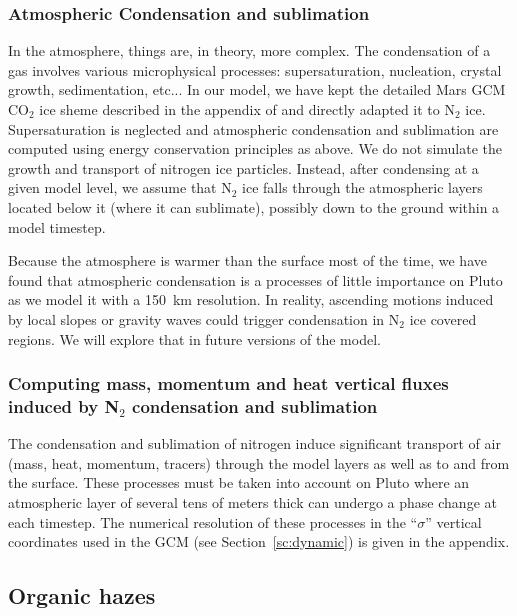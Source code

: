\subsubsection{Atmospheric Condensation and sublimation}

In the atmosphere, things are, in theory, more complex.
The condensation of a gas involves various
microphysical processes: supersaturation,  nucleation,
crystal growth, sedimentation, etc...
In our model, we have kept the detailed Mars GCM CO$_2$ ice sheme described in
the appendix of \citet{Forg:98} and directly adapted it to N$_2$ ice.
Supersaturation is neglected and
atmospheric condensation and sublimation are computed using energy
conservation principles as above. 
We do not simulate the growth and transport of nitrogen ice particles.
Instead, after condensing at a given model level, we assume that
N$_2$ ice falls through the atmospheric layers
located below it (where it can sublimate),
possibly down to the ground within a model timestep.

Because the atmosphere is warmer than the surface most of the time, we have found
that atmospheric condensation is a processes of little importance on Pluto as we
model it with a 150~km resolution. In reality, ascending motions induced by local
slopes or gravity waves could trigger condensation in N$_2$ ice covered regions. 
We will explore that in future versions of the model. 

\subsubsection{Computing mass, momentum and heat vertical fluxes induced by N$_2$
condensation and sublimation}

The condensation and sublimation of nitrogen
induce significant transport of air (mass, heat, momentum, tracers)
through the model layers as well as to and from the surface. 
These processes must be taken into account on Pluto 
where an atmospheric layer of several tens of  meters thick can undergo a phase change 
at each timestep. The numerical resolution of these processes in the 
``$\sigma$'' vertical coordinates used in the GCM (see Section~\ref{sc:dynamic}) 
is given in the appendix. 

\subsection{Organic hazes}

